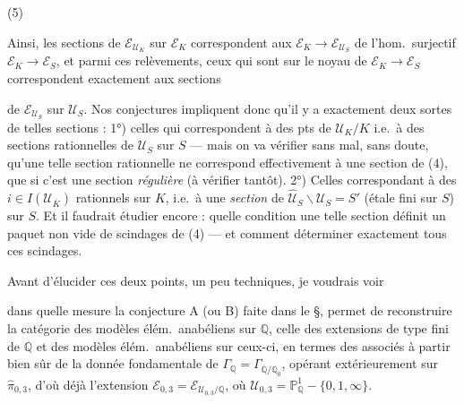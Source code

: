 \documentclass[11pt,a4paper]{article}
\begin{document}
(5)



Ainsi, les sections de $\mathcal{E}_{\mathcal{U}_K}$ sur $\mathcal{E}_K$ correspondent aux   $\mathcal{E}_K \to \mathcal{E}_{\mathcal{U}_S}$ de l'hom.\ surjectif $\mathcal{E}_K \to \mathcal{E}_S$, et parmi ces relèvements, ceux qui sont \struck{\ill{}}  sur le noyau de $\mathcal{E}_K \to \mathcal{E}_S$ correspondent exactement aux sections


de $\mathcal{E}_{\mathcal{U}_S}$ sur $\mathcal{U}_S$. Nos conjectures impliquent donc qu'il y a exactement deux sortes de telles sections : 1°) celles qui correspondent à des pts de $\mathcal{U}_K/K$ i.e.\ à des sections rationnelles de $\mathcal{U}_S$ sur $S$ --- mais on va vérifier sans mal, sans doute, qu'une telle section rationnelle ne correspond effectivement à une section de  (4), que si c'est une section  \emph{régulière} (à vérifier tantôt). 2°) Celles correspondant à des $i \in I(\mathcal{U}_{\overline{K}})$ rationnels sur $K$, i.e.\ à une \emph{section} de $\widehat{\mathcal{U}}_S \smallsetminus \mathcal{U}_S = S'$ (étale fini sur $S$) sur $S$. Et il faudrait étudier encore : quelle condition une telle section définit un paquet non vide de scindages de (4) --- et comment déterminer exactement tous ces scindages.

Avant d'élucider ces deux points, un peu techniques, je voudrais voir

dans quelle mesure la conjecture A (ou B) faite dans le §, permet de reconstruire la catégorie des modèles élém.\ anabéliens sur $\mathbb{Q}$,  celle des extensions de type fini de $\mathbb{Q}$ et des modèles élém.\ anabéliens sur ceux-ci, en termes des    associés à partir bien sûr de la donnée fondamentale de $\Gamma_{\mathbb{Q}} = \Gamma_{\overline{\mathbb{Q}}/\mathbb{Q}_0}$, opérant extérieurement sur $\widehat{\pi}_{0,3}$, d'où déjà l'extension $\mathcal{E}_{0,3} = \mathcal{E}_{\mathcal{U}_{0,3}/\mathbb{Q}}$, où $\mathcal{U}_{0,3} = \mathbb{P}^1_{\mathbb{Q}} - \{0, 1, \infty\}$.
\end{document}
